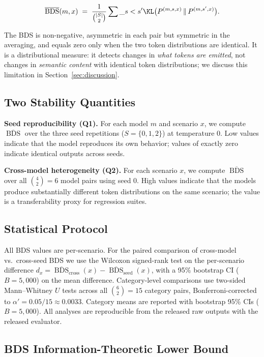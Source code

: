 \documentclass[11pt]{article}
\DeclareMathOperator{\BDS}{BDS}
\begin{document}
\begin{equation}
  \overline{\BDS}(m, x) \;=\; \frac{1}{\binom{|S|}{2}} \sum\_{s < s'}
  \KL\bigl(P^{(m,s,x)} \,\|\, P^{(m,s',x)}\bigr).
\end{equation}

The BDS is non-negative, asymmetric in each pair but symmetric in the
averaging, and equals zero only when the two token distributions are
identical. It is a distributional measure: it detects changes in \emph{what
tokens are emitted}, not changes in \emph{semantic content} with identical
token distributions; we discuss this limitation in
Section~\ref{sec:discussion}.

\subsection{Two Stability Quantities}

\textbf{Seed reproducibility (Q1).} For each model $m$ and scenario $x$, we
compute $\overline{\BDS}$ over the three seed repetitions
($S = \{0,1,2\}$) at temperature 0. Low values indicate that the model
reproduces its own behavior; values of exactly zero indicate identical
outputs across seeds.

\textbf{Cross-model heterogeneity (Q2).} For each scenario $x$, we compute
$\overline{\BDS}$ over all $\binom{4}{2} = 6$ model pairs using seed 0.
High values indicate that the models produce substantially different token
distributions on the same scenario; the value is a transferability proxy
for regression suites.

\subsection{Statistical Protocol}

All BDS values are per-scenario. For the paired comparison of cross-model
vs.\ cross-seed BDS we use the Wilcoxon signed-rank test on the
per-scenario difference $d_x = \overline{\BDS}_{\text{cross}}(x) - \overline{\BDS}_{\text{seed}}(x)$,
with a 95\% bootstrap CI ($B = 5{,}000$) on the mean difference.
Category-level comparisons use two-sided Mann--Whitney $U$ tests across
all $\binom{6}{2} = 15$ category pairs, Bonferroni-corrected to
$\alpha' = 0.05/15 \approx 0.0033$. Category means are reported with
bootstrap 95\% CIs ($B = 5{,}000$). All analyses are reproducible from the
released raw outputs with the released evaluator.

\subsection{BDS Information-Theoretic Lower Bound}
\end{document}
